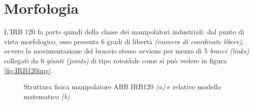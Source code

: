 \section{Morfologia}
L'IRB 120 fa parte quindi della classe dei manipolatori industriali: dal punto di vista morfologico, esso presenta 6 gradi di libertà \emph{(numero di coordinate libere)}, ovvero la movimentazione del braccio stesso avviene per mezzo di 5 \emph{bracci (links)} collegati da 6 \emph{giunti (joints)}\label{text:joints} di tipo rotoidale come si può vedere in figura \vref{fig:IRB120img}.
\begin{figure}[h]
	\centering
	\quad
	\caption{Struttura fisica manipolatore ABB IRB120 \emph{(a)} e relativo modello matematico \emph{(b)}}
	\label{fig:IRB120img}
\end{figure}

